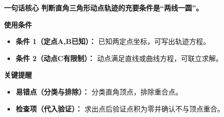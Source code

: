 \begin{summarybox}
	\textbf{\textcolor{CSummary}{一句话核心}}
	\textbf{判断直角三角形动点轨迹的充要条件是“两线一圆”。}

	\medskip
	\textbf{\textcolor{CSummary}{使用条件}}
	\begin{itemize}[leftmargin=*, itemsep=0.5em, topsep=0.4em]
		\item \textbf{条件 1（定点A,B已知）：} 已知两定点坐标，可写出轨迹方程。
		\item \textbf{条件 2（动点C有限制）：} 动点满足直线或曲线方程，可联立求解。
	\end{itemize}

	\medskip
	\textbf{\textcolor{CSummary}{关键提醒}}
	\begin{itemize}[leftmargin=*, itemsep=0.5em, topsep=0.4em]
		\item \textbf{易错点（分类与排除）：} 分类直角顶点，排除重合点。
		\item \textbf{检查项（代入验证）：} 求出点后验证点积为零并确认不与顶点重合。
	\end{itemize}

\end{summarybox}
